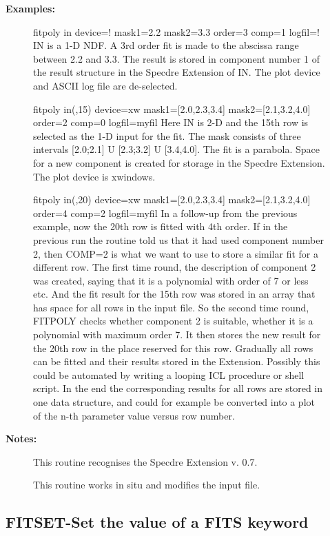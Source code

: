 \begin{description}
\begin{description}
\begin{terminalv}
\end{terminalv}

\item [\textbf{Examples:}]
\begin{terminalv}
fitpoly in device=! mask1=2.2 mask2=3.3 order=3 comp=1 logfil=!
   IN is a 1-D NDF. A 3rd order fit is made to the abscissa range
   between 2.2 and 3.3. The result is stored in component number 1
   of the result structure in the Specdre Extension of IN. The
   plot device and ASCII log file are de-selected.

fitpoly in(,15) device=xw mask1=[2.0,2.3,3.4] mask2=[2.1,3.2,4.0]
      order=2 comp=0 logfil=myfil
   Here IN is 2-D and the 15th row is selected as the 1-D input
   for the fit. The mask consists of three intervals
   [2.0;2.1] U [2.3;3.2] U [3.4,4.0]. The fit is a parabola. Space
   for a new component is created for storage in the Specdre
   Extension. The plot device is xwindows.

fitpoly in(,20) device=xw mask1=[2.0,2.3,3.4] mask2=[2.1,3.2,4.0]
      order=4 comp=2 logfil=myfil
   In a follow-up from the previous example, now the 20th row is
   fitted with 4th order. If in the previous run the routine told
   us that it had used component number 2, then COMP=2 is what we
   want to use to store a similar fit for a different row.
   The first time round, the description of component 2 was
   created, saying that it is a polynomial with order of 7
   or less etc. And the fit result for the 15th row was stored in
   an array that has space for all rows in the input file.
   So the second time round, FITPOLY checks whether component 2
   is suitable, whether it is a polynomial with maximum
   order 7. It then stores the new result for the 20th row in the
   place reserved for this row.
   Gradually all rows can be fitted and their results stored in
   the Extension. Possibly this could be automated by writing a
   looping ICL procedure or shell script.
   In the end the corresponding results for all rows are stored in
   one data structure, and could for example be converted into a
   plot of the n-th parameter value versus row number.
\end{terminalv}

\item [\textbf{Notes:}]
This routine recognises the Specdre Extension v. 0.7.

This routine works in situ and modifies the input file.
\end{description}
\subsection{FITSET-\label{FITSET}Set the value of a FITS keyword}
\begin{description}


\end{description}
\end{description}
